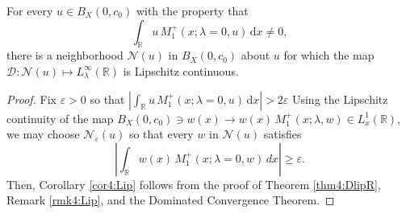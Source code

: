 \documentclass[../dissertation.tex]{subfiles}
\begin{document}
\begin{cor}\label{cor4:Lip}
	For every $u \in B_X(0, c_0)$ with the property that
	\[
		\int_{\mathbb R} u\,M_1^+(x; \lambda = 0, u) \, \mathrm{d}x \ne 0,
	\]
	there is a neighborhood $\mathcal N(u)$ in $B_X(0, c_0)$ about $u$ 
	for which the map $\mathscr D : \mathcal N(u) \mapsto 
	L_\lambda^\infty(\mathbb R)$ is Lipschitz continuous. 
\end{cor}
\begin{proof}
	Fix $\varepsilon > 0$ so that 
	$\left| \int_{\mathbb R} u\,M_1^+(x; \lambda = 0, u) \, \mathrm{d}x \right| > 2\varepsilon$
	Using the Lipschitz continuity of the map 
	$B_X(0, c_0) \ni w(x) \to  w(x)\, M_1^+(x; \lambda, w)
	\in L_x^1(\mathbb R)$, we may choose $\mathcal N_\varepsilon(u)$ so that 
	every $w$ in $\mathcal N(u)$ satisfies 
	\[
		\left| \int_{\mathbb R} w(x)\, M_1^+(x; \lambda=0, w)\,dx \right|
			\geq \varepsilon.
	\]
	Then, Corollary \ref{cor4:Lip} follows from the proof of Theorem 
	\ref{thm4:DlipR}, Remark \ref{rmk4:Lip}, and the Dominated Convergence
	Theorem.
\end{proof}
\end{document}
